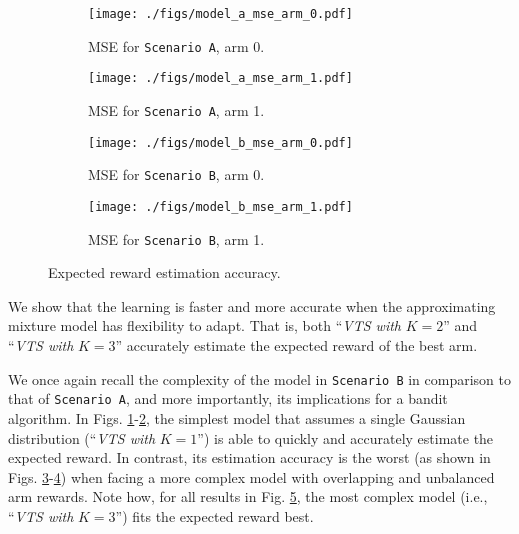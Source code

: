\documentclass{article}
\newcommand{\ie}{i.e., }
\begin{document}
\begin{figure}[!h]
	\centering
	\begin{subfigure}[b]{0.49\textwidth}
		\texttt{[image: ./figs/model\_a\_mse\_arm\_0.pdf]}
		\caption{MSE for \texttt{Scenario A}, arm 0.}
		\label{fig:model_a_mse_arm_0}
	\end{subfigure}
	\begin{subfigure}[b]{0.49\textwidth}
		\texttt{[image: ./figs/model\_a\_mse\_arm\_1.pdf]}
		\caption{MSE for \texttt{Scenario A}, arm 1.}
		\label{fig:model_a_mse_arm_1}
	\end{subfigure}
	
	\begin{subfigure}[b]{0.49\textwidth}
		\texttt{[image: ./figs/model\_b\_mse\_arm\_0.pdf]}
		\caption{MSE for \texttt{Scenario B}, arm 0.}
		\label{fig:model_b_mse_arm_0}
	\end{subfigure}
	\begin{subfigure}[b]{0.49\textwidth}
		\texttt{[image: ./figs/model\_b\_mse\_arm\_1.pdf]}
		\caption{MSE for \texttt{Scenario B}, arm 1.}
		\label{fig:model_b_mse_arm_1}
	\end{subfigure}
	\caption{Expected reward estimation accuracy.}
	\label{fig:mse_comparison}
\end{figure}

We show that the learning is faster and more accurate when the approximating mixture model has flexibility to adapt. That is, both ``\textit{VTS with }$K=2$'' and ``\textit{VTS with }$K=3$'' accurately estimate the expected reward of the best arm.

We once again recall the complexity of the model in \texttt{Scenario B} in comparison to that of \texttt{Scenario A}, and more importantly, its implications for a bandit algorithm. In Figs. \ref{fig:model_a_mse_arm_0}-\ref{fig:model_a_mse_arm_1}, the simplest model that assumes a single Gaussian distribution (``\textit{VTS with }$K=1$'') is able to quickly and accurately estimate the expected reward. In contrast, its estimation accuracy is the worst (as shown in Figs. \ref{fig:model_b_mse_arm_0}-\ref{fig:model_b_mse_arm_1}) when facing a more complex model with overlapping and unbalanced arm rewards. Note how, for all results in Fig. \ref{fig:mse_comparison}, the most complex model (\ie ``\textit{VTS with }$K=3$'') fits the expected reward best.
\end{document}
